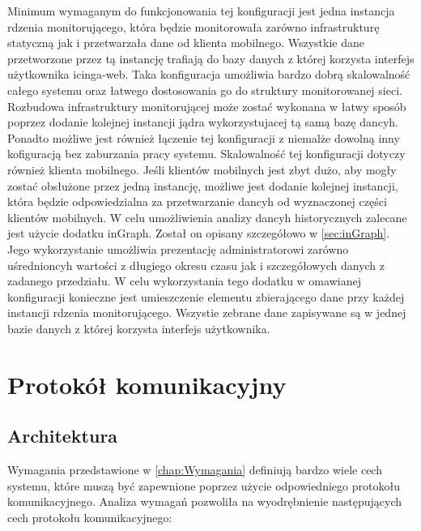 Minimum wymaganym do funkcjonowania tej konfiguracji jest jedna
instancja rdzenia monitorującego, która będzie monitorowała zarówno
infrastrukturę statyczną jak i przetwarzała dane od klienta
mobilnego. Wszystkie dane przetworzone przez tą instancję trafiają do
bazy danych z której korzysta interfejs użytkownika icinga-web. Taka
konfiguracja umożliwia bardzo dobrą skalowalność całego systemu oraz
łatwego dostosowania go do struktury monitorowanej sieci. Rozbudowa
infrastruktury monitorującej może zostać wykonana w łatwy sposób
poprzez dodanie kolejnej instancji jądra wykorzystujacej tą samą bazę
dancyh. Ponadto możliwe jest również łączenie tej konfiguracji z
niemalże dowolną inny kofiguracją bez zaburzania pracy
systemu. Skalowalność tej konfiguracji dotyczy również klienta
mobilnego. Jeśli klientów mobilnych jest zbyt dużo, aby mogły zostać
obsłużone przez jedną instancję, możliwe jest dodanie kolejnej
instancji, która będzie odpowiedzialna za przetwarzanie dancyh od
wyznaczonej części klientów mobilnych. W celu umożliwienia analizy
dancyh historycznych zalecane jest użycie dodatku inGraph. Został on
opisany szczegółowo w \ref{sec:inGraph}. Jego wykorzystanie umożliwia
prezentację administratorowi zarówno uśrednioncyh wartości z długiego
okresu czasu jak i szczegółowych danych z zadanego przedziału. W celu
wykorzystania tego dodatku w omawianej konfiguracji konieczne jest
umieszczenie elementu zbierającego dane przy każdej instancji rdzenia
monitorującego. Wszystie zebrane dane zapisywane są w jednej bazie
danych z której korzysta interfejs użytkownika.



\section[Protokół komunikacyjny][Protokół komunikacyjny]{Protokół komunikacyjny}
\label{sec:ProtKom}
\subsection[Architektura][Architektura]{Architektura}

Wymagania przedstawione w \ref{chap:Wymagania} definiują bardzo wiele
cech systemu, które muszą być zapewnione poprzez użycie odpowiedniego
protokołu komunikacyjnego. Analiza wymagań pozwoliła na wyodrębnienie
następujących cech protokołu komunikacyjnego:

